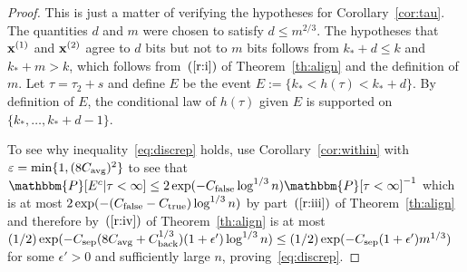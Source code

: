 \documentclass[final,12pt]{colt2018} %
\renewcommand{\P}{\mathbbm{P}}
\newcommand{\1}{\mathbf{1}}
\newcommand{\ep}{\epsilon}
\def\x{{\bf x}}
\def\ee{\varepsilon}
\def\csep{C_{\rm sep}} %
\def\cback{C_{\rm back}}
\def\ctrue{C_{\rm true}}
\def\cfalse{C_{\rm false}}
\def\cavg{C_{\rm avg}}
\begin{document}
\begin{proof}
	This is just a matter of verifying the hypotheses for Corollary~\ref{cor:tau}.
	The quantities $d$ and $m$ were chosen to satisfy $d \leq m^{2/3}$.
	The hypotheses that $\x^{(1)}$ and $\x^{(2)}$ agree to $d$ bits but not to $m$ bits
	follows from $k_* + d \leq k$ and $k_* + m > k$, which follows
	from~$(\ref{r:i})$ of Theorem~\ref{th:align} and the definition of $m$.
	Let $\tau = \tau_2 + s$
	and define $E$ be the event $E := \{ k_* < h(\tau) < k_* + d \}$.
	By definition of $E$, the conditional law
	of $h(\tau)$ given $E$ is supported on $\{ k_* , \ldots , k_* + d -1\}$.
	
	To see why inequality~\eqref{eq:discrep} holds, use
	Corollary~\ref{cor:within} with $\ee=\min\{1,(8\cavg)^2 \}$ to see that $\P [E^c | \tau < \infty] \leq 2 \exp(- \cfalse \log^{1/3} n) \P [\tau < \infty]^{-1}$ which is at most
	$2 \exp (- (\cfalse - \ctrue) \log^{1/3} n)$ by part~$(\ref{r:iii})$
	of Theorem~\ref{th:align} and therefore by~$(\ref{r:iv})$ of
	Theorem~\ref{th:align} is at most $(1/2)\exp (- \csep(8 \cavg
	+ \cback^{1/3} )(1+\ep') \log^{1/3} n) \leq (1/2)\exp (- \csep (1+\ep') m^{1/3})$ for some $\ep'>0$ and sufficiently large $n$, proving~\eqref{eq:discrep}.
	

\end{proof}
\end{document}
